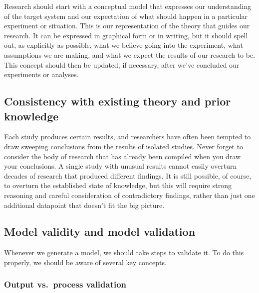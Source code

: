 \documentclass[
]{book}
\begin{document}
Research should start with a conceptual model that expresses our understanding of the target system and our expectation of what should happen in a particular experiment or situation. This is our representation of the theory that guides our research. It can be expressed in graphical form or in writing, but it should spell out, as explicitly as possible, what we believe going into the experiment, what assumptions we are making, and what we expect the results of our research to be. This concept should then be updated, if necessary, after we've concluded our experiments or analyses.

\hypertarget{consistency-with-existing-theory-and-prior-knowledge}{%
\subsection{Consistency with existing theory and prior knowledge}\label{consistency-with-existing-theory-and-prior-knowledge}}

Each study produces certain results, and researchers have often been tempted to draw sweeping conclusions from the results of isolated studies. Never forget to consider the body of research that has already been compiled when you draw your conclusions. A single study with unusual results cannot easily overturn decades of research that produced different findings. It is still possible, of course, to overturn the established state of knowledge, but this will require strong reasoning and careful consideration of contradictory findings, rather than just one additional datapoint that doesn't fit the big picture.

\hypertarget{model-validity-and-model-validation}{%
\subsection{Model validity and model validation}\label{model-validity-and-model-validation}}

Whenever we generate a model, we should take steps to validate it. To do this properly, we should be aware of several key concepts.

\hypertarget{output-vs.-process-validation}{%
\subsubsection{Output vs.~process validation}\label{output-vs.-process-validation}}
\end{document}
